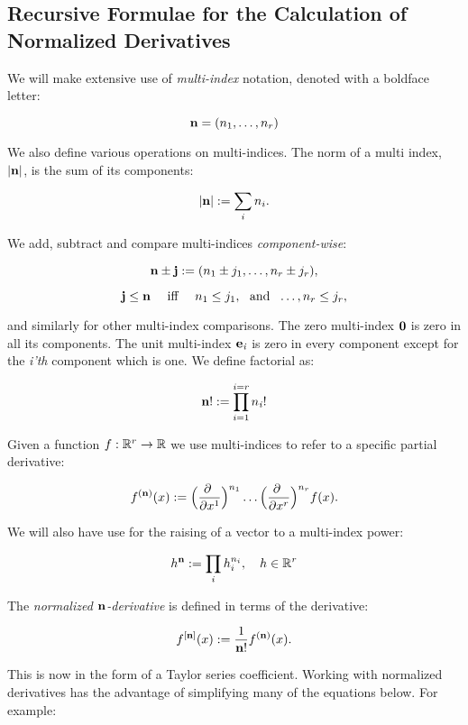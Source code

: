 \documentclass[11pt]{article}
\begin{document}
\subsection{Recursive Formulae for the Calculation of Normalized Derivatives}

We will make extensive use of {\it multi-index} notation, denoted with 
a boldface letter:

    $$ {\bf n} = (n_1, \dots, n_r) $$

We also define various operations on multi-indices.
The norm of a multi index, $|{\bf n}|$, is the sum of its components:

    $$ |{\bf n}| := \sum_i n_i. $$

We add, subtract and compare multi-indices {\it component-wise}:

    $$ {\bf n}\pm{\bf j} := (n_1\pm j_1, \dots, n_r\pm j_r), $$

    $$ {\bf j} \leq {\bf n} \quad \hbox{ iff }\quad  n_1\leq j_1, \ \hbox{ and }\ \dots, n_r\leq j_r, $$

and similarly for other multi-index comparisons.
The zero multi-index $\bf 0$ is zero in all its components.
The unit multi-index ${\bf e}_{\it i}$ is zero in every component except for the {\it i'th} component which is one.
We define factorial as:

    $$ {\bf n}! := \prod_{i=1}^{i=r} n_{\it i}! $$


Given a function $f:\mathbb{R}^r\to\mathbb{R}$ we use multi-indices to refer to a specific partial derivative:

    $$ f^{({\bfn})}(x) := \Bigl({\partial\ \over\partial x^1}\Bigr)^{n_1} \dots
\Bigl({\partial\ \over\partial x^r}\Bigr)^{n_r} f(x). $$

We will also have use for the raising of a vector to a multi-index power:

    $$ h^{\bf n} := \prod_i h_i^{n_i}, \quad h\in \mathbb{R}^r $$

The {\it normalized ${\bf n}$-derivative} is defined in terms of the derivative: 

    $$ f^{[{\bf n}]}(x) := {1\over \bf n!} f^{({\bf n})}(x). $$


This is now in the form of a Taylor series coefficient. 
Working with normalized derivatives 
has the advantage of simplifying many of the equations below.
For example:
\end{document}
